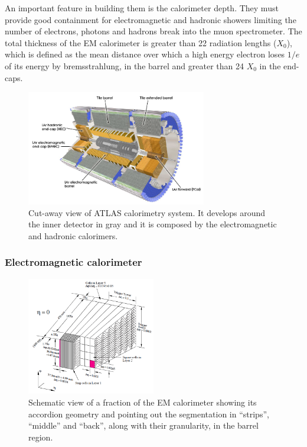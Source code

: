 An important feature in building them is the calorimeter depth. They must provide good containment for electromagnetic and hadronic showers limiting the number of electrons, photons and hadrons break into the muon spectrometer. The total thickness of the EM calorimeter is greater than 22 radiation lengths ($X_0$), which is defined as the mean distance over which a high energy electron loses $1/e$ of its energy by bremsstrahlung, in the barrel and greater than 24 $X_0$ in the end-caps.

\begin{figure}[p]
\centering
\includegraphics[width=0.7\textwidth]{LHC_ATLAS/Calorimetry}
\caption{Cut-away view of ATLAS calorimetry system. It develops around the inner detector in gray and it is composed by the electromagnetic and hadronic calorimers.}
\label{fig:Calos}
\end{figure}

\subsubsection{Electromagnetic calorimeter}
\begin{figure}[p]
\centering
\includegraphics[width=0.5\textwidth]{LHC_ATLAS/EMcalo}
\caption{Schematic view of a fraction of the EM calorimeter showing its accordion geometry and pointing out the segmentation in ``strips'', ``middle'' and ``back'', along with their granularity, in the  barrel region.}
\label{fig:EMlayers}
\end{figure}

